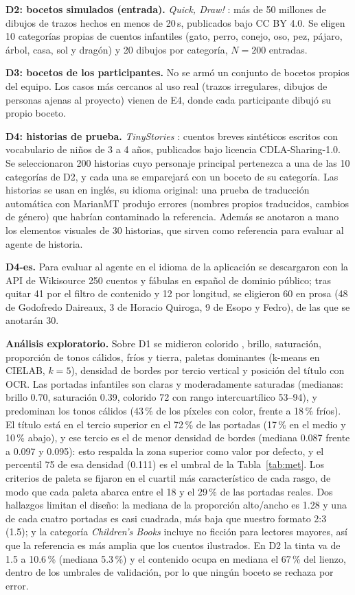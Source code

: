 \documentclass[10pt,a4paper,twocolumn]{article}
\begin{document}
\textbf{D2: bocetos simulados (entrada).} \emph{Quick, Draw!} \citep{ha2018,quickdraw}: más de 50 millones de dibujos de trazos hechos en menos de 20\,s, publicados bajo CC BY 4.0. Se eligen 10 categorías propias de cuentos infantiles (gato, perro, conejo, oso, pez, pájaro, árbol, casa, sol y dragón) y 20 dibujos por categoría, $N=200$ entradas.

\textbf{D3: bocetos de los participantes.} No se armó un conjunto de bocetos propios del equipo. Los casos más cercanos al uso real (trazos irregulares, dibujos de personas ajenas al proyecto) vienen de E4, donde cada participante dibujó su propio boceto.

\textbf{D4: historias de prueba.} \emph{TinyStories} \citep{eldan2023}: cuentos breves sintéticos escritos con vocabulario de niños de 3 a 4 años, publicados bajo licencia CDLA-Sharing-1.0. Se seleccionaron 200 historias cuyo personaje principal pertenezca a una de las 10 categorías de D2, y cada una se emparejará con un boceto de su categoría. Las historias se usan en inglés, su idioma original: una prueba de traducción automática con MarianMT \citep{tiedemann2020} produjo errores (nombres propios traducidos, cambios de género) que habrían contaminado la referencia. Además se anotaron a mano los elementos visuales de 30 historias, que sirven como referencia para evaluar al agente de historia.

\textbf{D4-es.} Para evaluar al agente en el idioma de la aplicación se descargaron con la API de Wikisource \citep{wikisource} 250 cuentos y fábulas en español de dominio público; tras quitar 41 por el filtro de contenido y 12 por longitud, se eligieron 60 en prosa (48 de Godofredo Daireaux, 3 de Horacio Quiroga, 9 de Esopo y Fedro), de las que se anotarán 30.

\textbf{Análisis exploratorio.} Sobre D1 se midieron colorido \citep{hasler2003}, brillo, saturación, proporción de tonos cálidos, fríos y tierra, paletas dominantes (k-means en CIELAB, $k=5$), densidad de bordes por tercio vertical y posición del título con OCR. Las portadas infantiles son claras y moderadamente saturadas (medianas: brillo 0.70, saturación 0.39, colorido 72 con rango intercuartílico 53--94), y predominan los tonos cálidos (43\,\% de los píxeles con color, frente a 18\,\% fríos). El título está en el tercio superior en el 72\,\% de las portadas (17\,\% en el medio y 10\,\% abajo), y ese tercio es el de menor densidad de bordes (mediana 0.087 frente a 0.097 y 0.095): esto respalda la zona superior como valor por defecto, y el percentil 75 de esa densidad (0.111) es el umbral de la Tabla~\ref{tab:met}. Los criterios de paleta se fijaron en el cuartil más característico de cada rasgo, de modo que cada paleta abarca entre el 18 y el 29\,\% de las portadas reales. Dos hallazgos limitan el diseño: la mediana de la proporción alto/ancho es 1.28 y una de cada cuatro portadas es casi cuadrada, más baja que nuestro formato 2:3 (1.5); y la categoría \emph{Children's Books} incluye no ficción para lectores mayores, así que la referencia es más amplia que los cuentos ilustrados. En D2 la tinta va de 1.5 a 10.6\,\% (mediana 5.3\,\%) y el contenido ocupa en mediana el 67\,\% del lienzo, dentro de los umbrales de validación, por lo que ningún boceto se rechaza por error.
\end{document}
